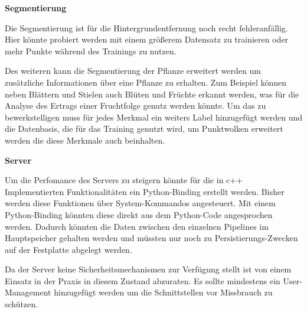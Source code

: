 \documentclass[12pt,titlepage, twoside]{article}
\begin{document}
\textbf{Segmentierung}

Die Segmentierung ist für die Hintergrundentfernung noch recht fehleranfällig. Hier könnte probiert werden mit einem größerem Datensatz zu trainieren oder mehr Punkte während des Trainings zu nutzen.

Des weiteren kann die Segmentierung der Pflanze erweitert werden um zusätzliche Informationen über eine Pflanze zu erhalten. Zum Beispiel können neben Blättern und Stielen auch Blüten und Früchte erkannt werden, was für die Analyse des Ertrags einer Fruchtfolge genutz werden könnte.
Um das zu bewerkstelligen muss für jedes Merkmal ein weiters Label hinzugefügt werden und die Datenbasis, die für das Training genutzt wird, um Punktwolken erweitert werden die diese Merkmale auch beinhalten.

\textbf{Server}

Um die Perfomance des Servers zu steigern könnte für die in c++ Implementierten Funktionalitäten ein Python-Binding erstellt werden. Bisher werden diese Funktionen über System-Kommandos angesteuert. 
Mit einem Python-Binding könnten diese direkt aus dem Python-Code angesprochen werden. Dadurch könnten die Daten zwischen den einzelnen Pipelines im Hauptspeicher gehalten werden und müssten nur noch zu Persistierungs-Zwecken auf der Festplatte abgelegt werden.

Da der Server keine Sicherheitsmechanismen zur Verfügung stellt ist von einem Einsatz in der Praxis in diesem Zustand abzuraten. Es sollte mindestens ein User-Management hinzugefügt werden um die Schnittstellen vor Missbrauch zu schützen.


\newpage



\end{document}
